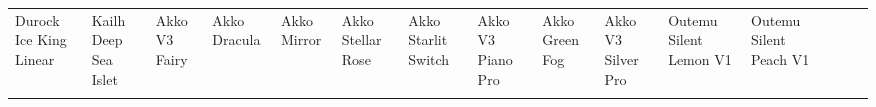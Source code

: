 \documentclass[a4paper]{article}
\begin{document}
\pagestyle{empty}
\begin{center}
\fontsize{7}{9}\selectfont
{\selectfont
\begin{tabular}{ : *{15}{C{1.19cm}:} }
\hdashline
Durock Ice King Linear & Kailh Deep Sea Islet & Akko V3 Fairy & Akko Dracula & Akko Mirror & Akko Stellar Rose & Akko Starlit Switch & Akko V3 Piano Pro & Akko Green Fog & Akko V3 Silver Pro & Outemu Silent Lemon V1 & Outemu Silent Peach V1 &  &  &  \\ 
\hdashline
\end{tabular}
}
\end{center}
\end{document}
